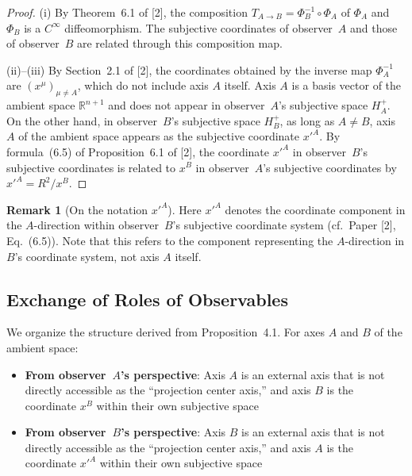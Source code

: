 \documentclass[a4paper,11pt]{article}
\theoremstyle{definition}
\newtheorem{remark}[theorem]{Remark}
\begin{document}
\begin{proof}
(i) By Theorem~6.1 of {[2]}, the composition \(T_{A \to B} = \Phi_B^{-1} \circ \Phi_A\) of \(\Phi_A\) and \(\Phi_B\) is a \(C^\infty\) diffeomorphism. The subjective coordinates of observer~\(A\) and those of observer~\(B\) are related through this composition map.

(ii)--(iii) By Section~2.1 of {[2]}, the coordinates obtained by the inverse map \(\Phi_A^{-1}\) are \((x^\mu)_{\mu \neq A}\), which do not include axis \(A\) itself. Axis \(A\) is a basis vector of the ambient space \(\mathbb{R}^{n+1}\) and does not appear in observer~\(A\)'s subjective space \(H_A^+\). On the other hand, in observer~\(B\)'s subjective space \(H_B^+\), as long as \(A \neq B\), axis \(A\) of the ambient space appears as the subjective coordinate \(x'^A\). By formula~(6.5) of Proposition~6.1 of {[2]}, the coordinate \(x'^A\) in observer~\(B\)'s subjective coordinates is related to \(x^B\) in observer~\(A\)'s subjective coordinates by \(x'^A = R^2/x^B\).
\end{proof}

\begin{remark}[On the notation \(x'^A\)]
Here \(x'^A\) denotes the coordinate component in the \(A\)-direction within observer~\(B\)'s subjective coordinate system (cf.\ Paper {[2]}, Eq.~(6.5)). Note that this refers to the component representing the \(A\)-direction in \(B\)'s coordinate system, not axis \(A\) itself.
\end{remark}

\subsection{Exchange of Roles of Observables}

We organize the structure derived from Proposition~4.1. For axes \(A\) and \(B\) of the ambient space:

\begin{itemize}
\item \textbf{From observer~\(A\)'s perspective}: Axis \(A\) is an external axis that is not directly accessible as the ``projection center axis,'' and axis \(B\) is the coordinate \(x^B\) within their own subjective space
\item \textbf{From observer~\(B\)'s perspective}: Axis \(B\) is an external axis that is not directly accessible as the ``projection center axis,'' and axis \(A\) is the coordinate \(x'^A\) within their own subjective space
\end{itemize}
\end{document}
